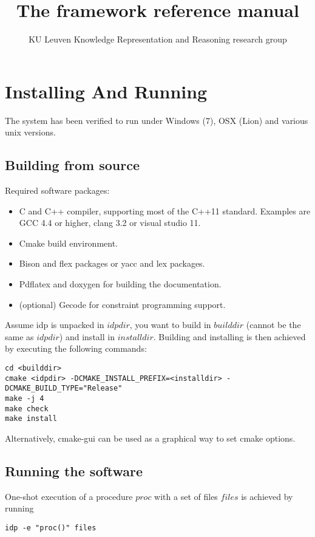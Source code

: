 \documentclass[a4]{article}
\title{The \idp framework reference manual}
\author{KU Leuven Knowledge Representation and Reasoning research group}
\begin{document}
\maketitle
\setlength{\parindent}{0pt}


\section{Installing And Running}

The system has been verified to run under Windows (7), OSX (Lion) and various unix versions.

\subsection{Building from source}
Required software packages:
\begin{itemize}
  \item C and C++ compiler, supporting most of the C++11 standard. Examples are GCC 4.4 or higher, clang 3.2 or visual studio 11.
  \item Cmake build environment. 
  \item Bison and flex packages or yacc and lex packages.
  \item Pdflatex and doxygen for building the documentation.
  \item (optional) Gecode for constraint programming support.
\end{itemize}

Assume idp is unpacked in $idpdir$, you want to build in $builddir$ (cannot be the same as $idpdir$) and install in $installdir$. Building and installing is then achieved by executing the following commands:
\begin{lstlisting}
cd <builddir>
cmake <idpdir> -DCMAKE_INSTALL_PREFIX=<installdir> -DCMAKE_BUILD_TYPE="Release"
make -j 4
make check
make install
\end{lstlisting}

Alternatively, cmake-gui can be used as a graphical way to set cmake options.

\subsection{Running the software}
One-shot execution of a procedure $proc$ with a set of files $files$ is achieved by running
\begin{lstlisting}
idp -e "proc()" files
\end{lstlisting}
\end{document}

